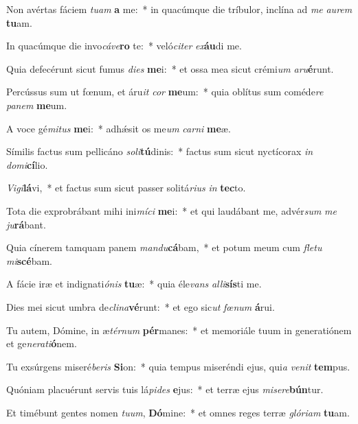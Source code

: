 \item Non avértas fáciem \textit{tu}\textit{am} \textbf{a} me:~* in quacúmque die tríbulor, inclína ad \textit{me} \textit{au}\textit{rem} \textbf{tu}am.
\item In quacúmque die invo\textit{cá}\textit{ve}\textbf{ro} te:~* veló\textit{ci}\textit{ter} \textit{ex}\textbf{áu}di me.
\item Quia defecérunt sicut fumus \textit{di}\textit{es} \textbf{me}i:~* et ossa mea sicut crémi\textit{um} \textit{a}\textit{ru}\textbf{é}runt.
\item Percússus sum ut fœnum, et áru\textit{it} \textit{cor} \textbf{me}um:~* quia oblítus sum coméde\textit{re} \textit{pa}\textit{nem} \textbf{me}um.
\item A voce gé\textit{mi}\textit{tus} \textbf{me}i:~* adhǽsit os me\textit{um} \textit{car}\textit{ni} \textbf{me}æ.
\item Símilis factus sum pellicáno \textit{so}\textit{li}\textbf{tú}dinis:~* factus sum sicut nyctícorax \textit{in} \textit{do}\textit{mi}\textbf{cí}lio.
\item \textit{Vi}\textit{gi}\textbf{lá}vi,~* et factus sum sicut passer solitá\textit{ri}\textit{us} \textit{in} \textbf{tec}to.
\item Tota die exprobrábant mihi ini\textit{mí}\textit{ci} \textbf{me}i:~* et qui laudábant me, advér\textit{sum} \textit{me} \textit{ju}\textbf{rá}bant.
\item Quia cínerem tamquam panem \textit{man}\textit{du}\textbf{cá}bam,~* et potum meum cum \textit{fle}\textit{tu} \textit{mi}\textbf{scé}bam.
\item A fácie iræ et indignati\textit{ó}\textit{nis} \textbf{tu}æ:~* quia éle\textit{vans} \textit{al}\textit{li}\textbf{sís}ti me.
\item Dies mei sicut umbra de\textit{cli}\textit{na}\textbf{vé}runt:~* et ego sic\textit{ut} \textit{fœ}\textit{num} \textbf{á}rui.
\item Tu autem, Dómine, in æ\textit{tér}\textit{num} \textbf{pér}manes:~* et memoriále tuum in generatiónem et ge\textit{ne}\textit{ra}\textit{ti}\textbf{ó}nem.
\item Tu exsúrgens miseré\textit{be}\textit{ris} \textbf{Si}on:~* quia tempus miseréndi ejus, qui\textit{a} \textit{ve}\textit{nit} \textbf{tem}pus.
\item Quóniam placuérunt servis tuis lá\textit{pi}\textit{des} \textbf{e}jus:~* et terræ ejus \textit{mi}\textit{se}\textit{re}\textbf{bún}tur.
\item Et timébunt gentes nomen \textit{tu}\textit{um}, \textbf{Dó}mine:~* et omnes reges terræ \textit{gló}\textit{ri}\textit{am} \textbf{tu}am.
